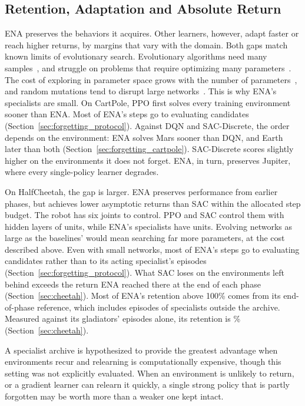 \subsection{Retention, Adaptation and Absolute Return}
\label{sec:retention}
ENA preserves the behaviors it acquires. Other learners, however, adapt faster or reach higher returns, by margins that vary with the domain. Both gaps match known limits of evolutionary search. Evolutionary algorithms need many samples~\citep{khadka2018evolutionary,pourchot2019cemrl}, and struggle on problems that require optimizing many parameters~\citep{khadka2018evolutionary}. The cost of exploring in parameter space grows with the number of parameters~\citep{vemula2019contrasting}, and random mutations tend to disrupt large networks~\citep{lehman2018safe}. This is why ENA's specialists are small. On CartPole, PPO first solves every training environment sooner than ENA. Most of ENA's steps go to evaluating candidates (Section~\ref{sec:forgetting_protocol}). Against DQN and SAC-Discrete, the order depends on the environment: ENA solves Mars sooner than DQN, and Earth later than both (Section~\ref{sec:forgetting_cartpole}). SAC-Discrete scores slightly higher on the environments it does not forget. ENA, in turn, preserves Jupiter, where every single-policy learner degrades.

On HalfCheetah, the gap is larger. ENA preserves performance from earlier phases, but achieves lower asymptotic returns than SAC within the allocated step budget. The robot has six joints to control. PPO and SAC control them with hidden layers of  units, while ENA's specialists have  units. Evolving networks as large as the baselines' would mean searching far more parameters, at the cost described above. Even with small networks, most of ENA's steps go to evaluating candidates rather than to its acting specialist's episodes (Section~\ref{sec:forgetting_protocol}). What SAC loses on the environments left behind exceeds the return ENA reached there at the end of each phase (Section~\ref{sec:cheetah}). Most of ENA's retention above 100\% comes from its end-of-phase reference, which includes episodes of specialists outside the archive. Measured against its gladiators' episodes alone, its retention is \% (Section~\ref{sec:cheetah}).

A specialist archive is hypothesized to provide the greatest advantage when environments recur and relearning is computationally expensive, though this setting was not explicitly evaluated. When an environment is unlikely to return, or a gradient learner can relearn it quickly, a single strong policy that is partly forgotten may be worth more than a weaker one kept intact.

